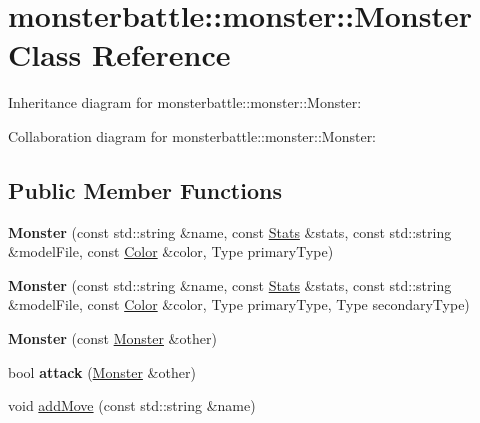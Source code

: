 \hypertarget{classmonsterbattle_1_1monster_1_1Monster}{}\section{monsterbattle\+:\+:monster\+:\+:Monster Class Reference}
\label{classmonsterbattle_1_1monster_1_1Monster}


Inheritance diagram for monsterbattle\+:\+:monster\+:\+:Monster\+:


Collaboration diagram for monsterbattle\+:\+:monster\+:\+:Monster\+:
\subsection*{Public Member Functions}
\begin{DoxyCompactItemize}
\item 
\mbox{\label{classmonsterbattle_1_1monster_1_1Monster_aadc09fe5ed8d74c92c1c80bb206ea60e}} 
{\bfseries Monster} (const std\+::string \&name, const \hyperlink{structmonsterbattle_1_1monster_1_1Stats}{Stats} \&stats, const std\+::string \&model\+File, const \hyperlink{structmonsterbattle_1_1Color}{Color} \&color, Type primary\+Type)
\item 
\mbox{\label{classmonsterbattle_1_1monster_1_1Monster_adcb7525112fc4bb49a332925da56a3d1}} 
{\bfseries Monster} (const std\+::string \&name, const \hyperlink{structmonsterbattle_1_1monster_1_1Stats}{Stats} \&stats, const std\+::string \&model\+File, const \hyperlink{structmonsterbattle_1_1Color}{Color} \&color, Type primary\+Type, Type secondary\+Type)
\item 
\mbox{\label{classmonsterbattle_1_1monster_1_1Monster_af11a9d05fe2373924d13bd6165eb779d}} 
{\bfseries Monster} (const \hyperlink{classmonsterbattle_1_1monster_1_1Monster}{Monster} \&other)
\item 
\mbox{\label{classmonsterbattle_1_1monster_1_1Monster_a7ded69390568b36210fd58069ffacad9}} 
bool {\bfseries attack} (\hyperlink{classmonsterbattle_1_1monster_1_1Monster}{Monster} \&other)
\item 
void \hyperlink{classmonsterbattle_1_1monster_1_1Monster_a4e6f4b3dbba830e6833341d3398c6a52}{add\+Move} (const std\+::string \&name)

\end{DoxyCompactItemize}
